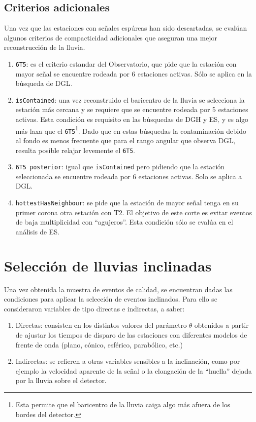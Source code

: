 	
	\subsection{Criterios adicionales}
	
	Una vez que las estaciones con señales espúreas han sido descartadas, se eval\'uan algunos criterios de compacticidad adicionales que aseguran una mejor reconstrucción de la lluvia.
	
	\begin{enumerate}
	 \item \texttt{6T5}: es el criterio estandar del Observatorio, que pide que la estación con mayor señal se encuentre rodeada por 6 estaciones activas. Sólo se aplica en la búsqueda de DGL.
	 \item \texttt{isContained}: una vez reconstruido el baricentro de la lluvia se selecciona la estación m\'as cercana y se requiere que se encuentre rodeada por 5 estaciones activas. Esta condici\'on es requisito en las búsquedas de DGH y ES, y es algo más laxa que el \texttt{6T5}\footnote{Esta permite que el baricentro de la lluvia caiga algo más afuera de los bordes del detector.}. 
	 Dado que en estas búsquedas la contaminación debido al fondo es menos frecuente que para el rango angular que observa DGL, resulta posible relajar levemente el \texttt{6T5}.
	 \item \texttt{6T5 posterior}: igual que \texttt{isContained} pero pidiendo que la estación seleccionada se encuentre rodeada por 6 estaciones activas. Solo se aplica a DGL.
	 \item \texttt{hottestHasNeighbour}: se pide que la estación de mayor señal tenga en su primer corona otra estación con T2. El objetivo de este corte es evitar eventos de baja multiplicidad con ``agujeros''. Esta condición s\'olo se eval\'ua en el análisis de ES.
	\end{enumerate}
	
\section{Selecci\'on de lluvias inclinadas}
\label{sc:inclinadosAuger}

Una vez obtenida la muestra de eventos de calidad, se encuentran dadas las condiciones para aplicar la selección de eventos inclinados.
Para ello se consideraron variables de tipo directas e indirectas, a saber:
\begin{enumerate}
 \item Directas: consisten en los distintos valores del parámetro $\theta$ obtenidos a partir de ajustar los tiempos de disparo de las estaciones con diferentes modelos de frente de onda (plano, cónico, esférico, parabólico, etc.)
 \item Indirectas: se refieren a otras variables sensibles a la inclinación, como por ejemplo la velocidad aparente de la señal o la elongación de la ``huella'' dejada por la lluvia sobre el detector.
\end{enumerate}
	
